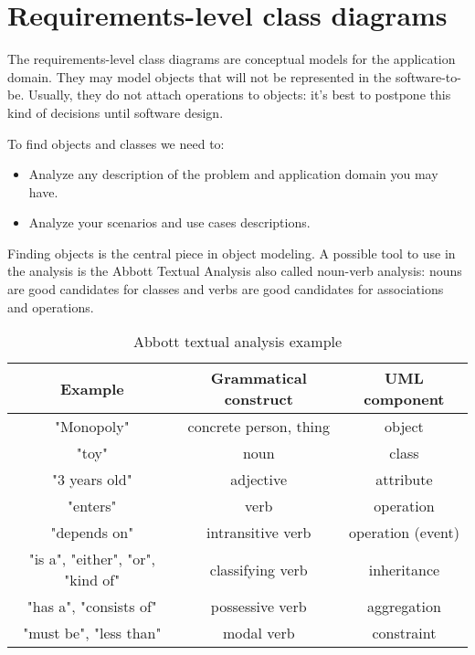 \section{Requirements-level class diagrams}

The requirements-level class diagrams are conceptual models for the application domain. They may model objects that will not be represented in the software-to-be. Usually, they 
do not attach operations to objects: it's best to postpone this kind of decisions until software design. 
    
To find objects and classes we need to:
\begin{itemize}
    \item Analyze any description of the problem and application domain you may have.
    \item Analyze your scenarios and use cases descriptions.
\end{itemize}
Finding objects is the central piece in object modeling. A possible tool to use in the analysis is the Abbott Textual Analysis also called noun-verb analysis: nouns are good 
candidates for classes and verbs are good candidates for associations and operations. 
\begin{table}[H]
    \centering
    \begin{tabular}{ccc}
    \textbf{Example}                  & \textbf{Grammatical construct} & \textbf{UML component} \\ \hline
    "Monopoly"                        & concrete person, thing         & object                 \\
    "toy"                             & noun                           & class                  \\ \hline
    "3 years old"                     & adjective                      & attribute              \\ \hline
    "enters"                          & verb                           & operation              \\
    "depends on"                      & intransitive verb              & operation (event)      \\ \hline
    "is a", "either", "or", "kind of" & classifying verb               & inheritance            \\ \hline
    "has a", "consists of"            & possessive verb                & aggregation            \\ \hline
    "must be", "less than"            & modal verb                     & constraint             \\ \hline
    \end{tabular}
    \caption{Abbott textual analysis example}
\end{table}